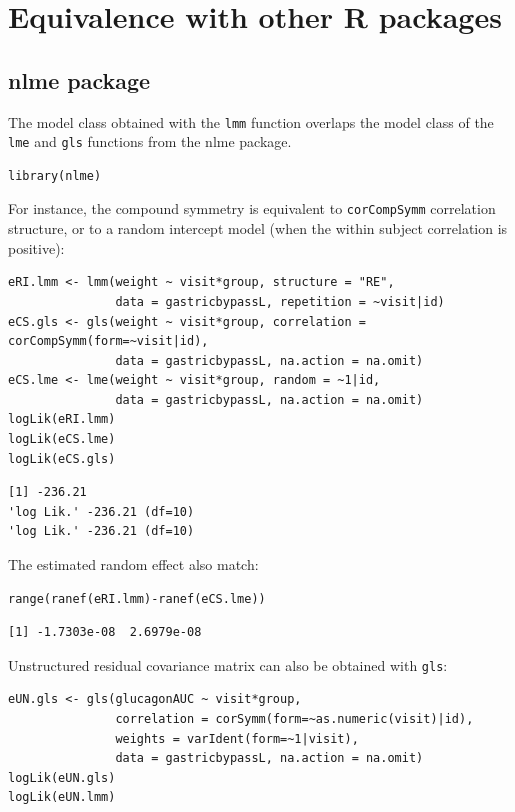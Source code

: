 \documentclass[12pt]{article}
\begin{document}
\clearpage

\section{Equivalence with other R packages}
\label{sec:org9f6e752}

\subsection{nlme package}
\label{sec:orgf646217}

The model class obtained with the \texttt{lmm} function overlaps the model
class of the \texttt{lme} and \texttt{gls} functions from the nlme package.
\lstset{language=r,label= ,caption= ,captionpos=b,numbers=none}
\begin{lstlisting}
library(nlme)
\end{lstlisting}

For instance, the compound symmetry is equivalent to \texttt{corCompSymm}
correlation structure, or to a random intercept model (when the within
subject correlation is positive):
\lstset{language=r,label= ,caption= ,captionpos=b,numbers=none}
\begin{lstlisting}
eRI.lmm <- lmm(weight ~ visit*group, structure = "RE",
               data = gastricbypassL, repetition = ~visit|id)
eCS.gls <- gls(weight ~ visit*group, correlation = corCompSymm(form=~visit|id),
               data = gastricbypassL, na.action = na.omit)
eCS.lme <- lme(weight ~ visit*group, random = ~1|id,
               data = gastricbypassL, na.action = na.omit)
logLik(eRI.lmm)
logLik(eCS.lme)
logLik(eCS.gls)
\end{lstlisting}

\begin{verbatim}
[1] -236.21
'log Lik.' -236.21 (df=10)
'log Lik.' -236.21 (df=10)
\end{verbatim}


The estimated random effect also match:
\lstset{language=r,label= ,caption= ,captionpos=b,numbers=none}
\begin{lstlisting}
range(ranef(eRI.lmm)-ranef(eCS.lme))
\end{lstlisting}

\begin{verbatim}
[1] -1.7303e-08  2.6979e-08
\end{verbatim}


Unstructured residual covariance matrix can also be obtained with
\texttt{gls}:
\lstset{language=r,label= ,caption= ,captionpos=b,numbers=none}
\begin{lstlisting}
eUN.gls <- gls(glucagonAUC ~ visit*group,
               correlation = corSymm(form=~as.numeric(visit)|id),
               weights = varIdent(form=~1|visit),
               data = gastricbypassL, na.action = na.omit)
logLik(eUN.gls)
logLik(eUN.lmm)
\end{lstlisting}
\end{document}
